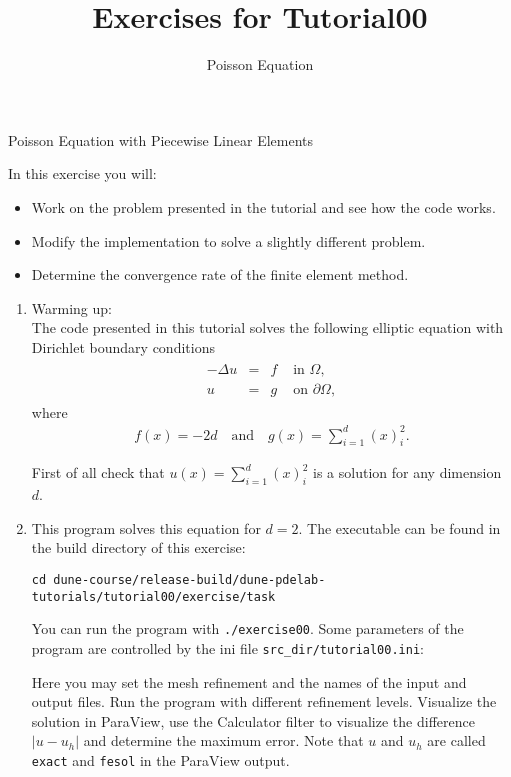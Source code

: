 \documentclass[12pt,a4paper]{article}
\title{\textbf{Exercises for Tutorial00}}
\subtitle{Poisson Equation}
\newcommand{\Laplace}{\Delta}
\begin{document}
\exerciseheader

\begin{Exercise}{Poisson Equation with Piecewise Linear Elements}

In this exercise you will:
\begin{itemize}
\item Work on the problem presented in the tutorial and see how the
  code works.
\item Modify the implementation to solve a slightly different problem.
\item Determine the convergence rate of the finite element method.
\end{itemize}

\begin{enumerate}
\item {\sc Warming up}:\\
  The code presented in this tutorial solves the following elliptic
  equation with Dirichlet boundary conditions
  \begin{align*}
    \begin{array}{rcll}
      -\Laplace u  & = & f & \text{ in } \Omega, \\
      u & = & g & \text{ on } \partial\Omega,
    \end{array}
  \end{align*}
  where
  \begin{align*}
    f(x) = -2d \quad\text{and}\quad  g(x) = \sum_{i=1}^d (x)_i^2.
  \end{align*}

  First of all check that $u(x) = \sum_{i=1}^d (x)_i^2$ is a solution
  for any dimension $d$.

  \item This program solves this equation for $d=2$. The executable can be
  found in the build directory of this exercise:
  \begin{lstlisting}
cd dune-course/release-build/dune-pdelab-tutorials/tutorial00/exercise/task
  \end{lstlisting}
  You can run the program with \lstinline{./exercise00}.  Some
  parameters of the program are controlled by the ini file
  \lstinline{src_dir/tutorial00.ini}:
  

  Here you may set the mesh refinement and the names of the input and
  output files. Run the program with different refinement
  levels. Visualize the solution in ParaView, use the Calculator
  filter to visualize the difference $|u-u_h|$ and determine the
  maximum error. Note that $u$ and $u_h$ are called \lstinline{exact}
  and \lstinline{fesol} in the ParaView output.


\end{enumerate}
\end{Exercise}
\end{document}
